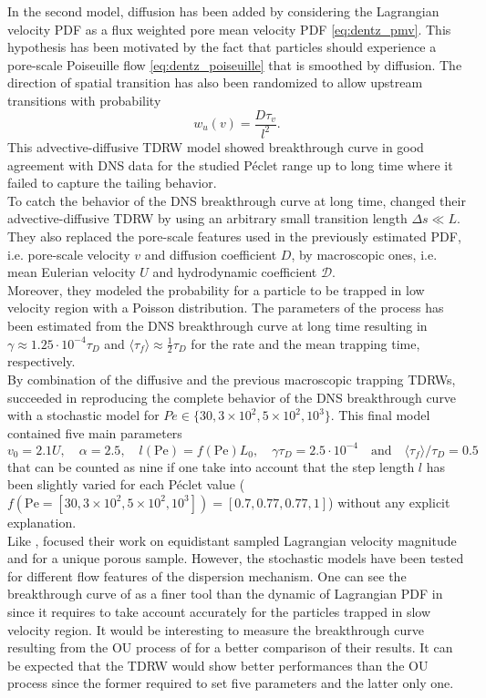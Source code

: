 In the second model, diffusion has been added by considering the Lagrangian velocity PDF as a flux weighted pore mean velocity PDF \eqref{eq:dentz_pmv}. This hypothesis has been motivated by the fact that particles should experience a pore-scale Poiseuille flow \eqref{eq:dentz_poiseuille} that is smoothed by diffusion.
The direction of spatial transition has also been randomized to allow upstream transitions with probability 
\[w_u(v)=\frac{D\tau_v}{l^2}.\]
This advective-diffusive TDRW model showed breakthrough curve in good agreement with DNS data for the studied Péclet range up to long time where it failed to capture the tailing behavior. \\
To catch the behavior of the DNS breakthrough curve at long time, \citeauthor{Dentz2017} changed their advective-diffusive TDRW by using an arbitrary small transition length $\Delta s\ll L$. 
They also replaced the pore-scale features used in the previously estimated PDF, i.e. pore-scale velocity $v$ and diffusion coefficient $D$, by macroscopic ones, i.e. mean Eulerian velocity $U$ and hydrodynamic coefficient $\mathcal{D}$.\\
Moreover, they modeled the probability for a particle to be trapped in low velocity region with a Poisson distribution. 
The parameters of the process has been estimated from the DNS breakthrough curve at long time resulting in $\gamma\approx1.25\cdot10^{-4}\tau_D$ and $\langle\tau_f\rangle\approx\frac{1}{2}\tau_D$ for the rate and the mean trapping time, respectively.\\
By combination of the diffusive and the previous macroscopic trapping TDRWs, \citeauthor{Dentz2017} succeeded in reproducing the complete behavior of the DNS breakthrough curve with a stochastic model for $Pe\in\{30, 3\times 10^2, 5\times 10^2, 10^3\}$. This final model contained five main parameters  
\[v_0=2.1U,\quad\alpha=2.5,\quad l(\mathrm{Pe})=f(\mathrm{Pe})L_0,\quad\gamma\tau_D=2.5\cdot 10^{-4}\quad\textrm{and}\quad\langle\tau_f\rangle/\tau_D=0.5\]
that can be counted as nine if one take into account that the step length $l$ has been slightly varied for each Péclet value ($f(\mathrm{Pe}=[30, 3\times 10^2, 5\times 10^2, 10^3])=[0.7,0.77,0.77,1]$) without any explicit explanation.\\
Like \citeauthor{Puyguiraud2019}, \citeauthor{Dentz2017} focused their work on equidistant sampled Lagrangian velocity magnitude and for a unique porous sample. However, the stochastic models have been tested for different flow features of the dispersion mechanism. 
One can see the breakthrough curve of \citeauthor{Dentz2017} as a finer tool than the dynamic of Lagrangian PDF in \citeauthor{Puyguiraud2019} since it requires to take account accurately for the particles trapped in slow velocity region.
It would be interesting to measure the breakthrough curve resulting from the OU process of \citet{Puyguiraud2019} for a better comparison  of their results.
It can be expected that the TDRW would show better performances than the OU process since the former required to set five parameters and the latter only one.

